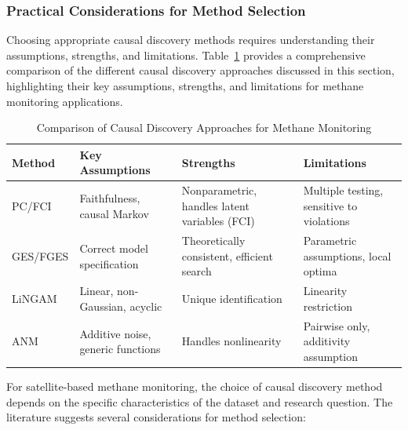 \subsubsection{Practical Considerations for Method Selection}

Choosing appropriate causal discovery methods requires understanding their assumptions, strengths, and limitations. Table~\ref{tab:discovery_methods} provides a comprehensive comparison of the different causal discovery approaches discussed in this section, highlighting their key assumptions, strengths, and limitations for methane monitoring applications.

\begin{table}[H]
	\centering
	\caption[Comparison of Causal Discovery Approaches for Methane Monitoring]{Comparison of Causal Discovery Approaches for Methane Monitoring}
	\label{tab:discovery_methods}
	\begin{tabular}{>{\raggedright\arraybackslash}p{2.5cm}|>{\raggedright\arraybackslash}p{3.5cm}|>{\raggedright\arraybackslash}p{3.5cm}|>{\raggedright\arraybackslash}p{3.5cm}}
		\hline
		\textbf{Method} & \textbf{Key Assumptions}          & \textbf{Strengths}                            & \textbf{Limitations}                      \\
		\hline
		PC/FCI          & Faithfulness, causal Markov       & Nonparametric, handles latent variables (FCI) & Multiple testing, sensitive to violations \\
		GES/FGES        & Correct model specification       & Theoretically consistent, efficient search    & Parametric assumptions, local optima      \\
		LiNGAM          & Linear, non-Gaussian, acyclic     & Unique identification                         & Linearity restriction                     \\
		ANM             & Additive noise, generic functions & Handles nonlinearity                          & Pairwise only, additivity assumption      \\
		\hline
	\end{tabular}
\end{table}

For satellite-based methane monitoring, the choice of causal discovery method depends on the specific characteristics of the dataset and research question. The literature suggests several considerations for method selection:

